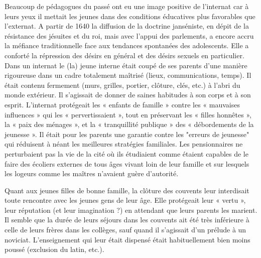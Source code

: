 Beaucoup de pédagogues du passé ont eu une image positive de l'internat car à leurs yeux il mettait les jeunes dans des conditions éducatives plus favorables que l'externat. A partir de 1640 la diffusion de la doctrine janséniste, en dépit de la résistance des jésuites et du roi, mais avec l'appui des parlements, a encore accru la méfiance traditionnelle face aux tendances spontanées des adolescents. Elle a conforté la répression des désirs en général et des désirs sexuels en particulier. Dans un internat le (la) jeune interne était coupé de ses parents d'une manière rigoureuse dans un cadre totalement maîtrisé (lieux, communications, temps). Il était contenu fermement (murs, grilles, portier, clôture, clés, etc.) à l'abri du monde extérieur. Il s'agissait de donner de saines habitudes à son corps et à son esprit.  L'internat protégeait les « enfants de famille » contre les « mauvaises influences » qui les « pervertissaient », tout en préservant les « filles honnêtes », la « paix des ménages », et la « tranquillité publique » des « débordements de la jeunesse ». Il était pour les parents une garantie contre les "erreurs de jeunesse" qui réduisent à néant les meilleures stratégies familiales. Les pensionnaires ne perturbaient pas la vie de la cité où ils étudiaient comme étaient capables de le faire des écoliers externes de tous âges vivant loin de leur famille et sur lesquels les logeurs comme les maîtres n'avaient guère d'autorité. 

Quant aux jeunes filles de bonne famille, la clôture des couvents leur interdisait toute rencontre avec les jeunes gens de leur âge. Elle protégeait leur « vertu », leur réputation (et leur imagination ?) en attendant que leurs parents les marient. Il semble que la durée de leurs séjours dans les couvents ait été très inférieure à celle de leurs frères dans les collèges, sauf quand il s'agissait d'un prélude à un noviciat. L'enseignement qui leur était dispensé était habituellement bien moins poussé (exclusion du latin, etc.).  

